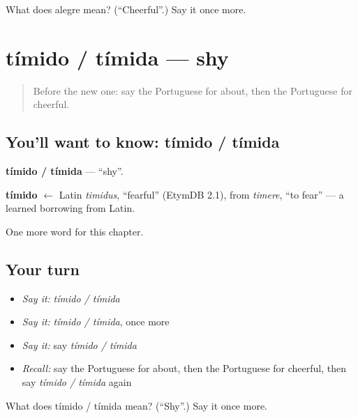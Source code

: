 \begin{tcolorbox}[breakable,colback=teal!4,colframe=teal!35!black,title={Before you move on}]
What does alegre mean? (\textquotedblleft{}Cheerful\textquotedblright{}.) Say it once more.
\end{tcolorbox}
\section[tímido / tímida]{tímido / tímida — shy}

\label{lesson:PT-C185-timido-timida}



\begin{quote}
Before the new one: say the Portuguese for about, then the Portuguese for cheerful.
\end{quote}

\subsection*{You'll want to know: tímido / tímida}
\textbf{tímido / tímida} — \textquotedblleft{}shy\textquotedblright{}.

\begin{cousinweb}
\textbf{tímido} $\leftarrow$ Latin \emph{timidus}, \textquotedblleft{}fearful\textquotedblright{} (EtymDB 2.1), from \emph{timere}, \textquotedblleft{}to fear\textquotedblright{} — a learned borrowing from Latin.
\end{cousinweb}

\begin{grammarlens}[title={What you've built}]
One more word for this chapter.
\end{grammarlens}

\subsection*{Your turn}
\begin{itemize}
\raggedright
  \item \emph{Say it:} \emph{tímido / tímida}
  \item \emph{Say it:} \emph{tímido / tímida}, once more
  \item \emph{Say it:} say \emph{tímido / tímida}
  \item \emph{Recall:} say the Portuguese for about, then the Portuguese for cheerful, then say \emph{tímido / tímida} again
\end{itemize}

\begin{tcolorbox}[breakable,colback=teal!4,colframe=teal!35!black,title={Before you move on}]
What does tímido / tímida mean? (\textquotedblleft{}Shy\textquotedblright{}.) Say it once more.
\end{tcolorbox}
